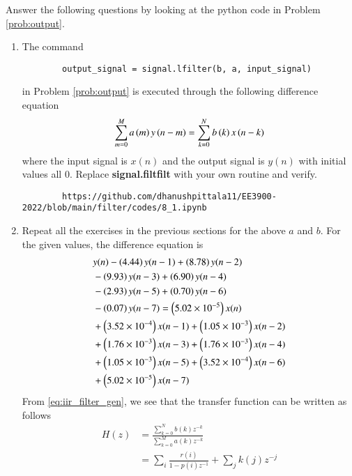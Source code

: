 \documentclass[journal,12pt,twocolumn]{IEEEtran}
\renewcommand\thesection{\arabic{section}}
\begin{document}
Answer the following questions by looking at the python code in Problem \ref{prob:output}.
\begin{enumerate}[label=\thesection.\arabic*]
	\item
	The command
	\begin{lstlisting}
		output_signal = signal.lfilter(b, a, input_signal)
	\end{lstlisting}
	in Problem \ref{prob:output} is executed through the following difference equation
	\begin{equation}
		\label{eq:iir_filter_gen}
		\sum _{m=0}^{M}a\left(m\right)y\left(n-m\right)=\sum _{k=0}^{N}b\left(k\right)x\left(n-k\right)
	\end{equation}
	where the input signal is $x(n)$ and the output signal is $y(n)$ with initial values all 0. Replace
	\textbf{signal.filtfilt} with your own routine and verify.
	\solution 
	\begin{lstlisting}
		https://github.com/dhanushpittala11/EE3900-2022/blob/main/filter/codes/8_1.ipynb
	\end{lstlisting}
	\item Repeat all the exercises in the previous sections for the above $a$ and $b$.
	\solution
	For the given values, the difference equation is
	\begin{align}
		&y(n) - \left(4.44\right)y(n - 1) + \left(8.78\right)y(n - 2) \nonumber \\
		&- \left(9.93\right)y(n - 3) + \left(6.90\right)y(n - 4) \nonumber \\
		&- \left(2.93\right)y(n - 5) \nonumber + \left(0.70\right)y(n - 6) \nonumber \\
		&- \left(0.07\right)y(n - 7) = \left(5.02 \times 10^{-5}\right)x(n) \nonumber \\
		&+ \left(3.52 \times 10^{-4}\right)x(n - 1) + \left(1.05 \times 10^{-3}\right)x(n - 2) \nonumber \\
		&+ \left(1.76 \times 10^{-3}\right)x(n - 3) + \left(1.76 \times 10^{-3}\right)x(n - 4) \nonumber \\
		&+ \left(1.05 \times 10^{-3}\right)x(n - 5) + \left(3.52 \times 10^{-4}\right)x(n - 6) \nonumber \\
		&+ \left(5.02 \times 10^{-5}\right)x(n - 7)
	\end{align}
	From \eqref{eq:iir_filter_gen}, we see that the transfer function can be written as follows
	\begin{align}
		H(z) &= \frac{\sum_{k = 0}^{N}b(k)z^{-k}}{\sum_{k = 0}^{M}a(k)z^{-k}} \\
		&= \sum_{i}\frac{r(i)}{1 - p(i)z^{-1}} + \sum_{j}k(j)z^{-j}
		\label{eq:trans-func}
	\end{align}

\end{enumerate}
\end{document}
